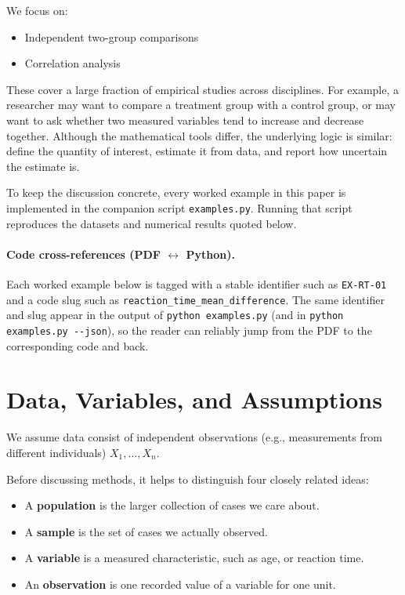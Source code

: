 \documentclass[11pt]{article}
\begin{document}
We focus on:
\begin{itemize}
\item Independent two-group comparisons
\item Correlation analysis
\end{itemize}

These cover a large fraction of empirical studies across disciplines. For example, a researcher may want to compare a treatment group with a control group, or may want to ask whether two measured variables tend to increase and decrease together. Although the mathematical tools differ, the underlying logic is similar: define the quantity of interest, estimate it from data, and report how uncertain the estimate is.

To keep the discussion concrete, every worked example in this paper is implemented in the companion script \verb|examples.py|. Running that script reproduces the datasets and numerical results quoted below.

\paragraph{Code cross-references (PDF $\leftrightarrow$ Python).}
Each worked example below is tagged with a stable identifier such as \verb|EX-RT-01| and a code slug such as \verb|reaction_time_mean_difference|. The same identifier and slug appear in the output of \verb|python examples.py| (and in \verb|python examples.py --json|), so the reader can reliably jump from the PDF to the corresponding code and back.

\section{Data, Variables, and Assumptions}

We assume data consist of independent observations (e.g., measurements from different individuals) $X_1, \dots, X_n$.

Before discussing methods, it helps to distinguish four closely related ideas:
\begin{itemize}
\item A \textbf{population} is the larger collection of cases we care about.
\item A \textbf{sample} is the set of cases we actually observed.
\item A \textbf{variable} is a measured characteristic, such as age, or reaction time.
\item An \textbf{observation} is one recorded value of a variable for one unit.
\end{itemize}
\end{document}
